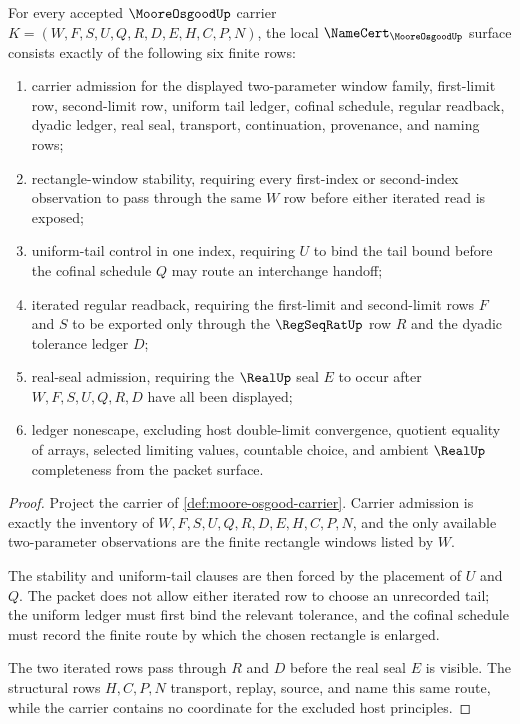 \begin{theorem}\label{thm:moore-osgood-namecert-obligations}
For every accepted $\MooreOsgoodUp$ carrier $K=(W,F,S,U,Q,R,D,E,H,C,P,N)$, the local $\NameCert_{\MooreOsgoodUp}$ surface consists exactly of the following six finite rows:
\begin{enumerate}
\item carrier admission for the displayed two-parameter window family, first-limit row, second-limit row, uniform tail ledger, cofinal schedule, regular readback, dyadic ledger, real seal, transport, continuation, provenance, and naming rows;
\item rectangle-window stability, requiring every first-index or second-index observation to pass through the same $W$ row before either iterated read is exposed;
\item uniform-tail control in one index, requiring $U$ to bind the tail bound before the cofinal schedule $Q$ may route an interchange handoff;
\item iterated regular readback, requiring the first-limit and second-limit rows $F$ and $S$ to be exported only through the $\RegSeqRatUp$ row $R$ and the dyadic tolerance ledger $D$;
\item real-seal admission, requiring the $\RealUp$ seal $E$ to occur after $W,F,S,U,Q,R,D$ have all been displayed;
\item ledger nonescape, excluding host double-limit convergence, quotient equality of arrays, selected limiting values, countable choice, and ambient $\RealUp$ completeness from the packet surface.
\end{enumerate}
\end{theorem}
\begin{proof}
Project the carrier of \autoref{def:moore-osgood-carrier}. Carrier admission is exactly the inventory of $W,F,S,U,Q,R,D,E,H,C,P,N$, and the only available two-parameter observations are the finite rectangle windows listed by $W$.

The stability and uniform-tail clauses are then forced by the placement of $U$ and $Q$. The packet does not allow either iterated row to choose an unrecorded tail; the uniform ledger must first bind the relevant tolerance, and the cofinal schedule must record the finite route by which the chosen rectangle is enlarged.

The two iterated rows pass through $R$ and $D$ before the real seal $E$ is visible. The structural rows $H,C,P,N$ transport, replay, source, and name this same route, while the carrier contains no coordinate for the excluded host principles.
\end{proof}

